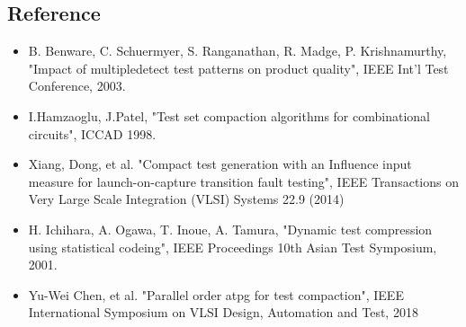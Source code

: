 \documentclass{report}
\begin{document}
\begin{CJK}{UTF8}{bkai}
\section{Reference}

  \begin{itemize}

    \item B. Benware, C. Schuermyer, S. Ranganathan, R. Madge, P. Krishnamurthy,
          "Impact of multipledetect test patterns on product quality",
          IEEE Int’l Test Conference, 2003.
    \item I.Hamzaoglu, J.Patel,
          "Test set compaction algorithms for combinational circuits",
          ICCAD 1998.
    \item Xiang, Dong, et al.
          "Compact test generation with an Influence input measure for launch-on-capture transition fault testing",
          IEEE Transactions on Very Large Scale Integration (VLSI) Systems 22.9 (2014)
    \item H. Ichihara, A. Ogawa, T. Inoue, A. Tamura,
          "Dynamic test compression using statistical codeing",
          IEEE Proceedings 10th Asian Test Symposium, 2001.
    \item Yu-Wei Chen, et al.
          "Parallel order atpg for test compaction",
          IEEE International Symposium on VLSI Design, Automation and Test, 2018

  \end{itemize}

\end{CJK}
\end{document}
